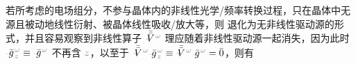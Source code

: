 若所考虑的电场组分，不参与晶体内的非线性光学/频率转换过程，只在晶体中无源且被动地线性衍射、被晶体线性吸收/放大等，则  退化为无非线性驱动源的形式，并且容易观察到非线性算子 $\Xint{\mathcolor{gray}{-}}{21}{\bar{\bar{V}}}^{\;\! \mathcolor{gray}{\omega}}$ 理应随着非线性驱动源一起消失，因为此时 $\Xint{{}^{}_{\mathcolor{gray}{-}}}{10}{\bar{g}}^{\;\!\mathcolor{gray}{\omega}}_{\;\! \mathcolor{gray}{z}} \equiv \Xint{{}^{}_{\mathcolor{gray}{-}}}{10}{\bar{g}}^{\;\!\mathcolor{gray}{\omega}}$ 不再含 $\mathcolor{gray}{z}$，以至于 $\Xint{\mathcolor{gray}{-}}{21}{\bar{\bar{V}}}^{\;\! \mathcolor{gray}{\omega}} \Xint{{}^{}_{\mathcolor{gray}{-}}}{10}{\bar{g}}^{\;\!\mathcolor{gray}{\omega}}_{\;\! \mathcolor{gray}{z}} \equiv \Xint{\mathcolor{gray}{-}}{21}{\bar{\bar{V}}}^{\;\! \mathcolor{gray}{\omega}} \Xint{{}^{}_{\mathcolor{gray}{-}}}{10}{\bar{g}}^{\;\!\mathcolor{gray}{\omega}} = \bar{0}$，则有
